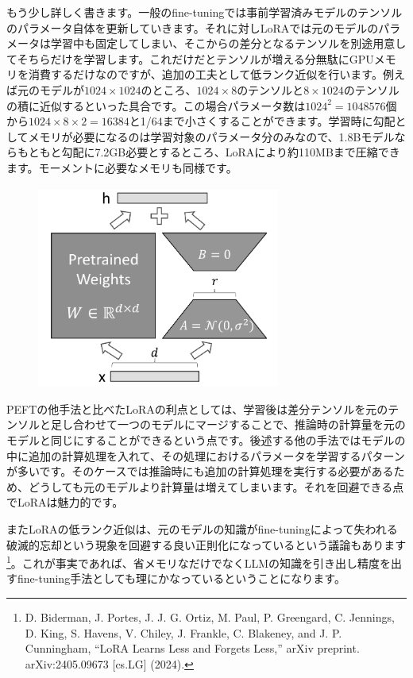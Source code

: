 \documentclass[a5paper,twoside,dvipdfmx]{jsarticle}
\begin{document}
もう少し詳しく書きます。一般のfine-tuningでは事前学習済みモデルのテンソルのパラメータ自体を更新していきます。それに対しLoRAでは元のモデルのパラメータは学習中も固定してしまい、そこからの差分となるテンソルを別途用意してそちらだけを学習します。これだけだとテンソルが増える分無駄にGPUメモリを消費するだけなのですが、追加の工夫として低ランク近似を行います。例えば元のモデルが$1024 \times 1024$のところ、$1024 \times 8$のテンソルと$8 \times 1024$のテンソルの積に近似するといった具合です。この場合パラメータ数は$1024^2 = 1048576$個から$1024 \times 8 \times 2 = 16384$と1/64まで小さくすることができます。学習時に勾配としてメモリが必要になるのは学習対象のパラメータ分のみなので、1.8Bモデルならもともと勾配に7.2GB必要とするところ、LoRAにより約110MBまで圧縮できます。モーメントに必要なメモリも同様です。

\newpage

\begin{figure}[h]
  \centering
  \includegraphics[width=80mm]{../C105Fig/gray/lora_image.png}
 \end{figure} 

PEFTの他手法と比べたLoRAの利点としては、学習後は差分テンソルを元のテンソルと足し合わせて一つのモデルにマージすることで、推論時の計算量を元のモデルと同じにすることができるという点です。後述する他の手法ではモデルの中に追加の計算処理を入れて、その処理におけるパラメータを学習するパターンが多いです。そのケースでは推論時にも追加の計算処理を実行する必要があるため、どうしても元のモデルより計算量は増えてしまいます。それを回避できる点でLoRAは魅力的です。

またLoRAの低ランク近似は、元のモデルの知識がfine-tuningによって失われる\textsf{破滅的忘却}という現象を回避する良い正則化になっているという議論もあります\footnote{D. Biderman, J. Portes, J. J. G. Ortiz, M. Paul, P. Greengard, C. Jennings, D. King, S. Havens, V. Chiley, J. Frankle, C. Blakeney, and J. P. Cunningham, “LoRA Learns Less and Forgets Less,” arXiv preprint. arXiv:2405.09673 [cs.LG] (2024).}。これが事実であれば、省メモリなだけでなくLLMの知識を引き出し精度を出すfine-tuning手法としても理にかなっているということになります。
\end{document}
